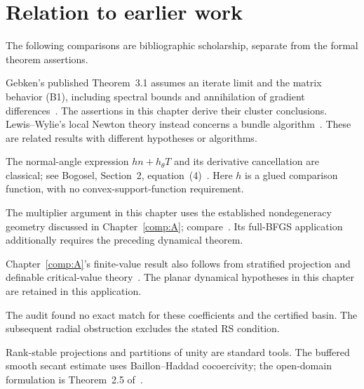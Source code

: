 \endgroup


\section*{Relation to earlier work}
The following comparisons are bibliographic scholarship, separate from the formal theorem assertions.

Gebken's published Theorem~3.1 assumes an iterate limit and the matrix behavior (B1), including spectral bounds and annihilation of gradient differences~\cite{BG}. The assertions in this chapter derive their cluster conclusions. Lewis--Wylie's local Newton theory instead concerns a bundle algorithm~\cite{LW}. These are related results with different hypotheses or algorithms.

The normal-angle expression $h n+h_\theta T$ and its derivative cancellation are classical; see Bogosel, Section~2, equation~(4)~\cite{geom_Bogosel2023}. Here $h$ is a glued comparison function, with no convex-support-function requirement.

The multiplier argument in this chapter uses the established nondegeneracy geometry discussed in Chapter~\ref{comp:A}; compare~\cite{LW,BG}. Its full-BFGS application additionally requires the preceding dynamical theorem.

Chapter~\ref{comp:A}'s finite-value result also follows from stratified projection and definable critical-value theory~\cite{BDLS}. The planar dynamical hypotheses in this chapter are retained in this application.

The audit found no exact match for these coefficients and the certified basin. The subsequent radial obstruction excludes the stated RS condition.

Rank-stable projections and partitions of unity are standard tools. The buffered smooth secant estimate uses Baillon--Haddad cocoercivity; the open-domain formulation is Theorem~2.5 of~\cite{WW}.
